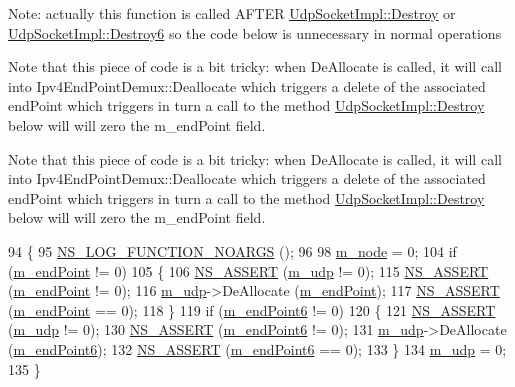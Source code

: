 Note\+: actually this function is called A\+F\+T\+ER \hyperlink{classns3_1_1UdpSocketImpl_ab0f9092f8f28c5d246cae63476215fc8}{Udp\+Socket\+Impl\+::\+Destroy} or \hyperlink{classns3_1_1UdpSocketImpl_a40198099b528e0edbcfa323287c676bd}{Udp\+Socket\+Impl\+::\+Destroy6} so the code below is unnecessary in normal operations

Note that this piece of code is a bit tricky\+: when De\+Allocate is called, it will call into Ipv4\+End\+Point\+Demux\+::\+Deallocate which triggers a delete of the associated end\+Point which triggers in turn a call to the method \hyperlink{classns3_1_1UdpSocketImpl_ab0f9092f8f28c5d246cae63476215fc8}{Udp\+Socket\+Impl\+::\+Destroy} below will will zero the m\+\_\+end\+Point field.

Note that this piece of code is a bit tricky\+: when De\+Allocate is called, it will call into Ipv4\+End\+Point\+Demux\+::\+Deallocate which triggers a delete of the associated end\+Point which triggers in turn a call to the method \hyperlink{classns3_1_1UdpSocketImpl_ab0f9092f8f28c5d246cae63476215fc8}{Udp\+Socket\+Impl\+::\+Destroy} below will will zero the m\+\_\+end\+Point field.
\begin{DoxyCode}
94 \{
95   \hyperlink{log-macros-disabled_8h_a8f7e4afc291c9d29a65c18ac1f79197b}{NS\_LOG\_FUNCTION\_NOARGS} ();
96 
98   \hyperlink{classns3_1_1UdpSocketImpl_af6a19247be3d8917b582af77337730c3}{m\_node} = 0;
104   \textcolor{keywordflow}{if} (\hyperlink{classns3_1_1UdpSocketImpl_a4ea3006a4e49185d06360beba92f4073}{m\_endPoint} != 0)
105     \{
106       \hyperlink{assert_8h_a6dccdb0de9b252f60088ce281c49d052}{NS\_ASSERT} (\hyperlink{classns3_1_1UdpSocketImpl_ace4b90c1ab6f4f302cdb4cd8da973514}{m\_udp} != 0);
115       \hyperlink{assert_8h_a6dccdb0de9b252f60088ce281c49d052}{NS\_ASSERT} (\hyperlink{classns3_1_1UdpSocketImpl_a4ea3006a4e49185d06360beba92f4073}{m\_endPoint} != 0);
116       \hyperlink{classns3_1_1UdpSocketImpl_ace4b90c1ab6f4f302cdb4cd8da973514}{m\_udp}->DeAllocate (\hyperlink{classns3_1_1UdpSocketImpl_a4ea3006a4e49185d06360beba92f4073}{m\_endPoint});
117       \hyperlink{assert_8h_a6dccdb0de9b252f60088ce281c49d052}{NS\_ASSERT} (\hyperlink{classns3_1_1UdpSocketImpl_a4ea3006a4e49185d06360beba92f4073}{m\_endPoint} == 0);
118     \}
119   \textcolor{keywordflow}{if} (\hyperlink{classns3_1_1UdpSocketImpl_ad8b59997645c24d4550092d138270652}{m\_endPoint6} != 0)
120     \{
121       \hyperlink{assert_8h_a6dccdb0de9b252f60088ce281c49d052}{NS\_ASSERT} (\hyperlink{classns3_1_1UdpSocketImpl_ace4b90c1ab6f4f302cdb4cd8da973514}{m\_udp} != 0);
130       \hyperlink{assert_8h_a6dccdb0de9b252f60088ce281c49d052}{NS\_ASSERT} (\hyperlink{classns3_1_1UdpSocketImpl_ad8b59997645c24d4550092d138270652}{m\_endPoint6} != 0);
131       \hyperlink{classns3_1_1UdpSocketImpl_ace4b90c1ab6f4f302cdb4cd8da973514}{m\_udp}->DeAllocate (\hyperlink{classns3_1_1UdpSocketImpl_ad8b59997645c24d4550092d138270652}{m\_endPoint6});
132       \hyperlink{assert_8h_a6dccdb0de9b252f60088ce281c49d052}{NS\_ASSERT} (\hyperlink{classns3_1_1UdpSocketImpl_ad8b59997645c24d4550092d138270652}{m\_endPoint6} == 0);
133     \}
134   \hyperlink{classns3_1_1UdpSocketImpl_ace4b90c1ab6f4f302cdb4cd8da973514}{m\_udp} = 0;
135 \}
\end{DoxyCode}


